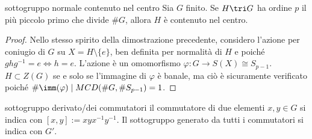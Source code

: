 \begin{proposition}{sottogruppo normale contenuto nel centro}
    Sia $G$ finito. Se $H \tri G$ ha ordine $p$ il più piccolo primo che divide $\#G$, allora $H$ è contenuto nel centro.
\end{proposition}
\begin{proof}
    Nello stesso spirito della dimostrazione precedente, considero l'azione per coniugio di $G$ su $X = H \setminus \{ e \}$, ben definita per normalità di $H$ e poiché $ghg^{-1} = e \Leftrightarrow h = e$. L'azione è un omomorfismo $\varphi : G \to S(X) \cong S_{p-1}$. $H \subset Z(G)$ se e solo se l'immagine di $\varphi$ è banale, ma ciò è sicuramente verificato poiché $\#\imm(\varphi) \mid MCD(\#G, \#S_{p-1}) = 1$.
\end{proof}
\begin{definition}{sottogruppo derivato/dei commutatori}
    il commutatore di due elementi $x,y \in G$ si indica con $[x,y]:= xyx^{-1}y^{-1}$. Il sottogruppo generato da tutti i commutatori si indica con $G'$. \\
\end{definition}
